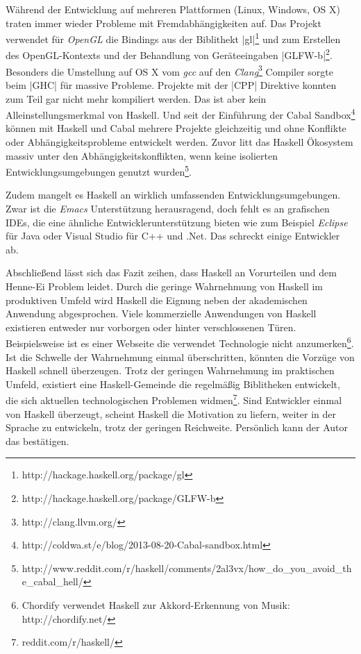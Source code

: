 Während der Entwicklung auf mehreren Plattformen (Linux, Windows, OS X) traten immer wieder Probleme mit Fremdabhängigkeiten auf. Das Projekt verwendet für \textit{OpenGL} die Bindings aus der Biblithekt |gl|\footnote{http://hackage.haskell.org/package/gl} und zum Erstellen des OpenGL-Kontexts und der Behandlung von Geräteeingaben |GLFW-b|\footnote{http://hackage.haskell.org/package/GLFW-b}. Besonders die Umstellung auf OS X vom \textit{gcc} auf den \textit{Clang}\footnote{http://clang.llvm.org/} Compiler sorgte beim |GHC| für massive Probleme. Projekte mit der |CPP| Direktive konnten zum Teil gar nicht mehr kompiliert werden. Das ist aber kein Alleinstellungsmerkmal von Haskell. Und seit der Einführung der Cabal Sandbox\footnote{http://coldwa.st/e/blog/2013-08-20-Cabal-sandbox.html} können mit Haskell und Cabal mehrere Projekte gleichzeitig und ohne Konflikte oder Abhängigkeitsprobleme entwickelt werden. Zuvor litt das Haskell Ökosystem massiv unter den Abhängigkeitskonflikten, wenn keine isolierten Entwicklungsumgebungen genutzt wurden\footnote{http://www.reddit.com/r/haskell/comments/2al3vx/how\_do\_you\_avoid\_the\_cabal\_hell/}.

Zudem mangelt es Haskell an wirklich umfassenden Entwicklungsumgebungen. Zwar ist die \textit{Emacs} Unterstützung herausragend, doch fehlt es an grafischen \ac{IDE}s, die eine ähnliche Entwicklerunterstützung bieten wie zum Beispiel \textit{Eclipse} für Java oder {Visual Studio} für C++ und .Net. Das schreckt einige Entwickler ab.

Abschließend lässt sich das Fazit zeihen, dass Haskell an Vorurteilen und dem Henne-Ei Problem leidet. Durch die geringe Wahrnehmung von Haskell im produktiven Umfeld wird Haskell die Eignung neben der akademischen Anwendung abgesprochen. Viele kommerzielle Anwendungen von Haskell existieren entweder nur vorborgen oder hinter verschlossenen Türen. Beispielsweise ist es einer Webseite die verwendet Technologie nicht anzumerken\footnote{Chordify verwendet Haskell zur Akkord-Erkennung von Musik: http://chordify.net/}. Ist die Schwelle der Wahrnehmung einmal überschritten, könnten die Vorzüge von Haskell schnell überzeugen. Trotz der geringen Wahrnehmung im praktischen Umfeld, existiert eine Haskell-Gemeinde die regelmäßig Biblitheken entwickelt, die sich aktuellen technologischen Problemen widmen\footnote{reddit.com/r/haskell/}. Sind Entwickler einmal von Haskell überzeugt, scheint Haskell die Motivation zu liefern, weiter in der Sprache zu entwickeln, trotz der geringen Reichweite. Persönlich kann der Autor das bestätigen.
